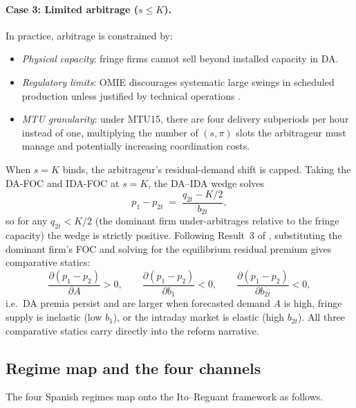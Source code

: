 \documentclass[11pt,a4paper]{article}
\begin{document}
\paragraph{Case 3: Limited arbitrage ($s \leq K$).} In practice,
arbitrage is constrained by:
\begin{itemize}
\item \emph{Physical capacity}: fringe firms cannot sell beyond
  installed capacity in DA.
\item \emph{Regulatory limits}: OMIE discourages systematic large
  swings in scheduled production unless justified by technical
  operations \citep{ito2016}.
\item \emph{MTU granularity}: under MTU15, there are four delivery
  subperiods per hour instead of one, multiplying the number of
  $(s,\pi)$ slots the arbitrageur must manage and potentially
  increasing coordination costs.
\end{itemize}
When $s=K$ binds, the arbitrageur's residual-demand shift is capped.
Taking the DA-FOC and IDA-FOC at $s=K$, the DA--IDA wedge solves
\[
p_1 - p_{2t}
   \;=\; \frac{q_{2t} - K/2}{b_{2t}},
\]
so for any $q_{2t}<K/2$ (the dominant firm under-arbitrages relative to
the fringe capacity) the wedge is strictly positive. Following
Result~3 of \citet{ito2016}, substituting the dominant firm's FOC and
solving for the equilibrium residual premium gives comparative statics:
\[
\frac{\partial(p_1-p_2)}{\partial A}>0,\qquad
\frac{\partial(p_1-p_2)}{\partial b_1}<0,\qquad
\frac{\partial(p_1-p_2)}{\partial b_{2t}}<0,
\]
i.e.\ DA premia persist and are larger when forecasted demand $A$ is
high, fringe supply is inelastic (low $b_1$), or the intraday market is
elastic (high $b_{2t}$). All three comparative statics carry directly
into the reform narrative.

\subsection{Regime map and the four channels}

The four Spanish regimes map onto the Ito--Reguant framework as follows.
\end{document}
